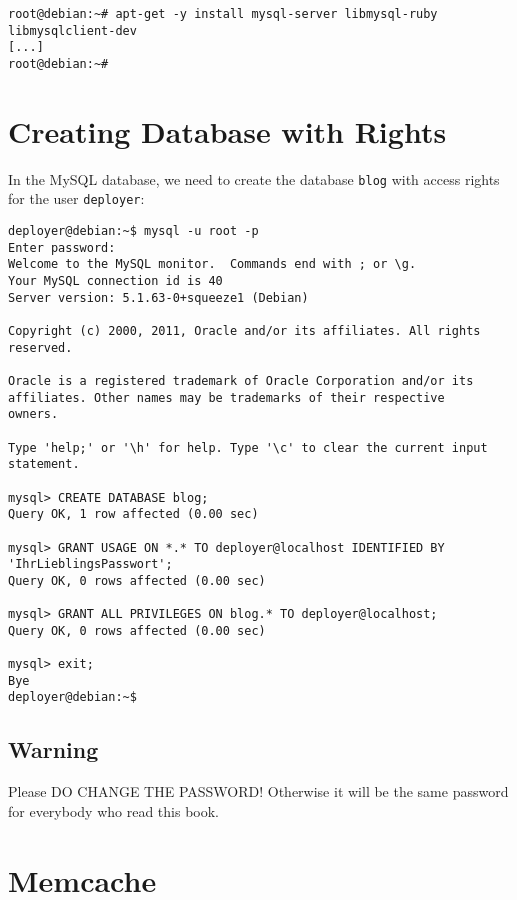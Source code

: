\documentclass[a4paper]{book}
\newcounter{tab}[chapter]
\begin{document}
\begin{shaded}\begin{verbatim}
root@debian:~# apt-get -y install mysql-server libmysql-ruby libmysqlclient-dev
[...]
root@debian:~#
\end{verbatim}\end{shaded}

\section{Creating Database with Rights}\label{creating-database-with-rights}

In the MySQL database, we need to create the database \texttt{blog} with access rights for the user \texttt{deployer}:

\begin{shaded}\begin{verbatim}
deployer@debian:~$ mysql -u root -p
Enter password:
Welcome to the MySQL monitor.  Commands end with ; or \g.
Your MySQL connection id is 40
Server version: 5.1.63-0+squeeze1 (Debian)

Copyright (c) 2000, 2011, Oracle and/or its affiliates. All rights reserved.

Oracle is a registered trademark of Oracle Corporation and/or its
affiliates. Other names may be trademarks of their respective
owners.

Type 'help;' or '\h' for help. Type '\c' to clear the current input statement.

mysql> CREATE DATABASE blog;
Query OK, 1 row affected (0.00 sec)

mysql> GRANT USAGE ON *.* TO deployer@localhost IDENTIFIED BY 'IhrLieblingsPasswort';
Query OK, 0 rows affected (0.00 sec)

mysql> GRANT ALL PRIVILEGES ON blog.* TO deployer@localhost;
Query OK, 0 rows affected (0.00 sec)

mysql> exit;
Bye
deployer@debian:~$
\end{verbatim}\end{shaded}

\subsection{Warning}\label{warning-17}

Please DO CHANGE THE PASSWORD! Otherwise it will be the same password for everybody who read this book.

\section{Memcache}\label{memcache}
\end{document}
